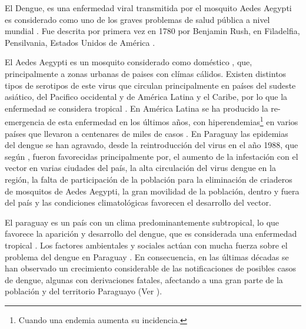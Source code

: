 El Dengue, es una enfermedad viral transmitida por el mosquito Aedes Aegypti es considerado como
uno de los graves problemas de salud pública a nivel mundial \citep{dengueUruguayCap1}. Fue
descrita por primera vez en 1780 por Benjamin Rush, en Filadelfia, Pensilvania, Estados Unidos de
América \citep{gustavo2006dengue}.

El Aedes Aegypti es un mosquito considerado como doméstico \citep{luevano1993ciclo}, que,
principalmente a zonas urbanas de paises con clímas cálidos. Existen distintos tipos de serotipos
de este virus que circulan principalmente en países del sudeste asiático, del Pacifico occidental
y de América Latina y el Caribe, por lo que la enfermedad se considera tropical
\citep{gustavo2006dengue}. En América Latina se ha producido la re-emergencia de esta enfermedad
en los últimos años, con hiperendemias\footnote{ Cuando una endemia aumenta su incidencia.} en
varios países que llevaron a centenares de miles de casos \citep{dengueUruguayCap1}. En Paraguay
las epidemias del dengue se han agravado, desde la reintroducción del virus en el año 1988, que
según \cite{planControlMspbs2014}, fueron favorecidas principalmente por, el aumento de la
infestación con el vector en varias ciudades del país, la alta circulación del virus dengue en la
región, la falta de participación de la población para la eliminación de criaderos de mosquitos de
Aedes Aegypti, la gran movilidad de la población, dentro y fuera del país y las condiciones
climatológicas favorecen el desarrollo del vector.

El paraguay es un país con un clima predominantemente subtropical, lo que favorece la aparición y
desarrollo del dengue, que es considerada una enfermedad tropical \cite{gustavo2006dengue}. Los
factores ambientales y sociales actúan con mucha fuerza sobre el problema del dengue en Paraguay
\cite{website:mspbsHistoria2014}. En consecuencia, en las últimas décadas se han observado un
crecimiento considerable de las notificaciones de posibles casos de dengue, algunas con
derivaciones fatales, afectando a una gran parte de la población y del territorio Paraguayo
(Ver ).

